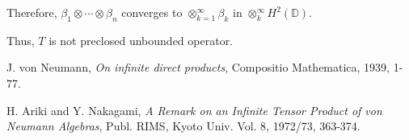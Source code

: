 \documentclass[a4paper,10pt]{amsart}
\newcommand{\Hd}{H^{2}(\mathbb{D})}
\begin{document}
Therefore, $\beta_1 \otimes \cdots \otimes \beta_n$ converges to 
$\otimes_{k=1}^{\infty}\beta_k$ in $\otimes_{k}^{\infty} \Hd$.

Thus, $T$ is not preclosed unbounded operator.


\begin{thebibliography}{9}
    J. von Neumann, 
    \emph{On infinite direct products},
    Compositio Mathematica, 1939, 1-77.

    H. Ariki and Y. Nakagami, 
    \emph{A Remark on an Infinite Tensor Product of 
    von Neumann Algebras},
    Publ. RIMS, Kyoto Univ. Vol. 8,  1972/73, 363-374.

\end{thebibliography}
\end{document}
